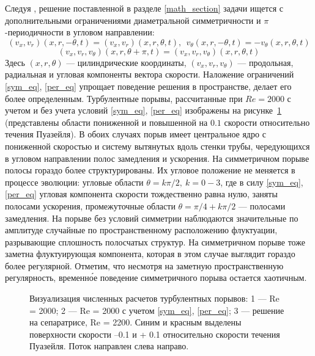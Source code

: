 Следуя \cite{Avila2013}, решение поставленной в разделе \ref{math_section} задачи ищется с дополнительными ограничениями диаметральной симметричности и $\pi$-периодичности в угловом направлении:
\begin{equation}\label{sym_eq}
(v_x,v_r)(x,r,-\theta,t)=(v_x,v_r)(x,r,\theta,t),\ \ v_\theta(x,r,-\theta,t)=-v_\theta(x,r,\theta,t)
\end{equation}
\begin{equation}\label{per_eq}
(v_x,v_r,v_\theta)(x,r,\theta+\pi,t) = (v_x,v_r,v_\theta)(x,r,\theta,t)
\end{equation}
Здесь $(x, r, \theta)$ --- цилиндрические координаты, $(v_x, v_r, v_\theta)$ --- продольная, радиальная и угловая компоненты вектора скорости. Наложение ограничений \eqref{sym_eq}, \eqref{per_eq} упрощает поведение решения в пространстве, делает его более определенным. Турбулентные порывы, рассчитанные при $Re=2000$ с учетом и без учета условий \eqref{sym_eq}, \eqref{per_eq} изображены на рисунке~\ref{3D_img} (представлены области пониженной и повышенной на $0.1$ скорости относительно течения Пуазейля). В обоих случаях порыв имеет центральное ядро с пониженной скоростью и систему вытянутых вдоль стенки трубы, чередующихся в угловом направлении полос замедления и ускорения. На симметричном порыве полосы гораздо более структурированы. Их угловое положение не меняется в процессе эволюции: угловые области $\theta=k\pi/2,\ k=0-3$, где в силу \eqref{sym_eq}, \eqref{per_eq} угловая компонента скорости тождественно равна нулю, заняты полосами ускорения, промежуточные области $\theta=\pi/4+k\pi/2$ --- полосами замедления. На порыве без условий симметрии наблюдаются значительные по амплитуде случайные по пространственному расположению флуктуации, разрывающие сплошность полосчатых структур. На симметричном порыве тоже заметна флуктуирующая компонента, которая в этом случае выглядит гораздо более регулярной. Отметим, что несмотря на заметную пространственную регулярность, временн\'{о}е поведение симметричного порыва остается хаотичным.


\begin{figure}[h]
\caption{Визуализация численных расчетов турбулентных порывов: 1 --- Re = 2000; 2 --- Re = 2000 с учетом \eqref{sym_eq}, \eqref{per_eq}; 3 --- решение на сепаратрисе, Re = 2200. Синим и красным выделены поверхности скорости –0.1 и + 0.1 относительно скорости течения Пуазейля. Поток направлен слева направо.}
\label{3D_img}
\end{figure}

